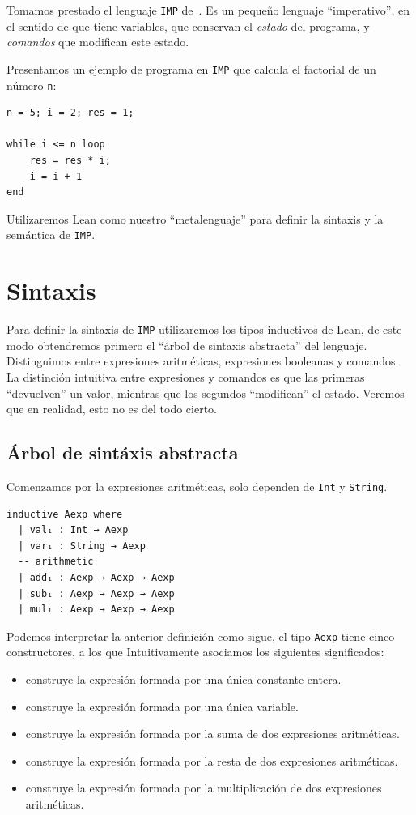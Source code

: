 \documentclass[../main.tex]{subfiles}
\begin{document}
Tomamos prestado el lenguaje \texttt{IMP} de~\cite{winskel1993formal}.
Es un pequeño lenguaje \enquote{imperativo}, en el sentido de que tiene variables, que 
conservan el \emph{estado} del programa, y \emph{comandos} que modifican
este estado.

Presentamos un ejemplo de programa en \texttt{IMP} que calcula el factorial de un número \texttt{n}:

\begin{verbatim}
n = 5; i = 2; res = 1;

while i <= n loop
    res = res * i;
    i = i + 1
end
\end{verbatim}

Utilizaremos Lean como nuestro \enquote{metalenguaje} para definir la sintaxis y la semántica
de \texttt{IMP}.

\section{Sintaxis}

Para definir la sintaxis de \texttt{IMP} utilizaremos los tipos inductivos de Lean,
de este modo obtendremos primero el \enquote{árbol de sintaxis abstracta} del lenguaje.
Distinguimos entre expresiones aritméticas, expresiones booleanas y comandos.
La distinción intuitiva entre expresiones y comandos es que las primeras
\enquote{devuelven} un valor, mientras que los segundos \enquote{modifican} el estado.
Veremos que en realidad, esto no es del todo cierto.

\subsection{Árbol de sintáxis abstracta}

Comenzamos por la expresiones aritméticas, solo dependen de \texttt{Int} y \texttt{String}.

\begin{verbatim}
inductive Aexp where
  | val₁ : Int → Aexp
  | var₁ : String → Aexp
  -- arithmetic
  | add₁ : Aexp → Aexp → Aexp
  | sub₁ : Aexp → Aexp → Aexp
  | mul₁ : Aexp → Aexp → Aexp
\end{verbatim}

Podemos interpretar la anterior definición como sigue, el tipo \texttt{Aexp} tiene
cinco constructores, a los que Intuitivamente asociamos los siguientes significados:
\begin{itemize}
  \item [\texttt{val₁}:] construye la expresión formada por una única constante entera.
  \item [\texttt{var₁}:] construye la expresión formada por una única variable.
  \item [\texttt{add₁}:] construye la expresión formada por la suma de dos expresiones aritméticas.
  \item [\texttt{sub₁}:] construye la expresión formada por la resta de dos expresiones aritméticas.
  \item [\texttt{mul₁}:] construye la expresión formada por la multiplicación de dos expresiones aritméticas.
\end{itemize}
\end{document}
